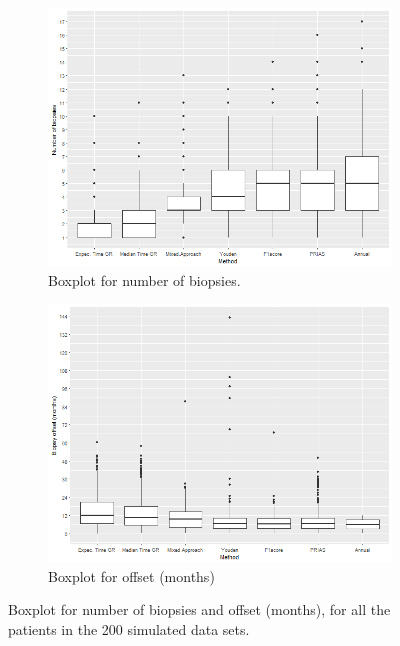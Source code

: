 \begin{figure}[!htb]
    \centering
    \captionsetup{justification=centering}
     \begin{subfigure}[b]{0.45\textwidth}
        \includegraphics[width=\textwidth]{images/sim_study/nbBoxPlot.png}
        \caption{Boxplot for number of biopsies.}
        \label{fig : nbBoxPlot}
    \end{subfigure}
    \begin{subfigure}[b]{0.45\textwidth}
        \includegraphics[width=\textwidth]{images/sim_study/offsetBoxPlot.png}
        \caption{Boxplot for offset (months)}
        \label{fig : offsetBoxPlot}
    \end{subfigure}      
    \caption{Boxplot for number of biopsies and offset (months), for all the patients in the 200 simulated data sets.}
\end{figure}
